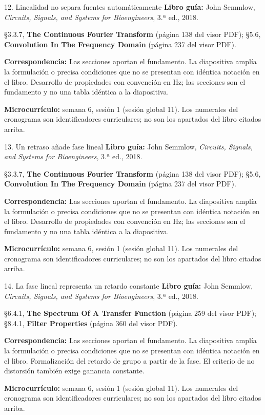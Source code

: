 \documentclass[
  10pt,
  ignorenonframetext,
  aspectratio=169,
  spanish,
]{beamer}
\begin{document}
\begin{frame}{12. Linealidad no separa fuentes automáticamente}
\label{linealidad-no-separa-fuentes-automuxe1ticamente}
\textbf{Libro guía:} John Semmlow, \emph{Circuits, Signals, and Systems
for Bioengineers}, 3.ª ed., 2018.

§3.3.7, \textbf{The Continuous Fourier Transform} (página 138 del visor
PDF); §5.6, \textbf{Convolution In The Frequency Domain} (página 237 del
visor PDF).

\textbf{Correspondencia:} Las secciones aportan el fundamento. La
diapositiva amplía la formulación o precisa condiciones que no se
presentan con idéntica notación en el libro. Desarrollo de propiedades
con convención en Hz; las secciones son el fundamento y no una tabla
idéntica a la diapositiva.

\textbf{Microcurrículo:} semana 6, sesión 1 (sesión global 11). Los
numerales del cronograma son identificadores curriculares; no son los
apartados del libro citados arriba.
\end{frame}

\begin{frame}{13. Un retraso añade fase lineal}
\label{un-retraso-auxf1ade-fase-lineal}
\textbf{Libro guía:} John Semmlow, \emph{Circuits, Signals, and Systems
for Bioengineers}, 3.ª ed., 2018.

§3.3.7, \textbf{The Continuous Fourier Transform} (página 138 del visor
PDF); §5.6, \textbf{Convolution In The Frequency Domain} (página 237 del
visor PDF).

\textbf{Correspondencia:} Las secciones aportan el fundamento. La
diapositiva amplía la formulación o precisa condiciones que no se
presentan con idéntica notación en el libro. Desarrollo de propiedades
con convención en Hz; las secciones son el fundamento y no una tabla
idéntica a la diapositiva.

\textbf{Microcurrículo:} semana 6, sesión 1 (sesión global 11). Los
numerales del cronograma son identificadores curriculares; no son los
apartados del libro citados arriba.
\end{frame}

\begin{frame}{14. La fase lineal representa un retardo constante}
\label{la-fase-lineal-representa-un-retardo-constante}
\textbf{Libro guía:} John Semmlow, \emph{Circuits, Signals, and Systems
for Bioengineers}, 3.ª ed., 2018.

§6.4.1, \textbf{The Spectrum Of A Transfer Function} (página 259 del
visor PDF); §8.4.1, \textbf{Filter Properties} (página 360 del visor
PDF).

\textbf{Correspondencia:} Las secciones aportan el fundamento. La
diapositiva amplía la formulación o precisa condiciones que no se
presentan con idéntica notación en el libro. Formalización del retardo
de grupo a partir de la fase. El criterio de no distorsión también exige
ganancia constante.

\textbf{Microcurrículo:} semana 6, sesión 1 (sesión global 11). Los
numerales del cronograma son identificadores curriculares; no son los
apartados del libro citados arriba.
\end{frame}
\end{document}
